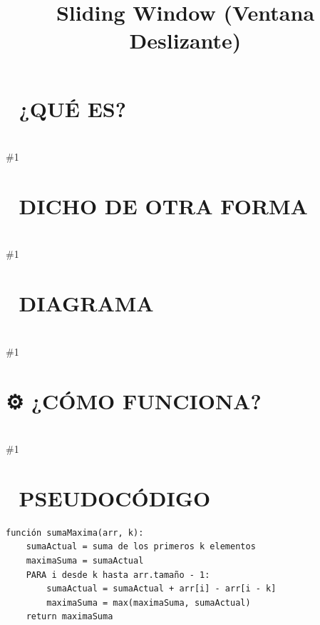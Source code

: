 \documentclass{article}
\newcommand{\quees}[1]{\section*{🤔 ¿QUÉ ES?}\hrulefill \\ \#1}
\newcommand{\dichodeotraforma}[1]{\section*{💬 DICHO DE OTRA FORMA}\hrulefill \\ \#1}
\newcommand{\diagrama}[1]{\section*{🎨 DIAGRAMA}\hrulefill \\ \#1}
\newcommand{\comofunciona}[1]{\section*{⚙️ ¿CÓMO FUNCIONA?}\hrulefill \\ \#1}
\begin{document}
\title{Sliding Window (Ventana Deslizante)}
\date{}
\maketitle
\quees{Una ventana de tren 🚂 donde ves paisajes mientras el tren avanza. 
La ventana tiene un tamaño fijo (por ejemplo, 3 metros de ancho).

Al avanzar, entra nuevo paisaje por un lado y sale el paisaje viejo
por el otro. No tienes que redibujar todo el paisaje cada vez, ¡solo
actualizas los bordes!

En programación, este patrón sirve para procesar sub-arreglos o 
sub-cadenas sin tener que recalcular todo desde cero en cada paso, 
lo cual ahorra muchísimo tiempo.}
\dichodeotraforma{El patrón Sliding Window convierte un problema de loops anidados O(n*k) 
en un problema de un solo loop O(n). 

Se usa cuando te piden algo sobre elementos CONTIGUOS de un array o 
string. Existen dos tipos:
1. Fixed Size: La ventana siempre mide K elementos.
2. Variable Size: La ventana crece o se encoge según una condición
   (usualmente usando dos punteros).}
\diagrama{\begin{verbatim}
Array: [ 1, 3, 2, 6, -1, 4 ]
Meta: Suma de cada ventana de tamaño 3.

Paso 1: [ 1, 3, 2 ] , 6, -1, 4  -> Suma = 6
Paso 2: 1, [ 3, 2, 6 ] , -1, 4  -> Suma = 11 (6 - 1 + 6)
Paso 3: 1, 3, [ 2, 6, -1 ] , 4  -> Suma = 7  (11 - 3 + (-1))

¡Solo restas el que sale y sumas el que entra! ⚡
\end{verbatim}}
\comofunciona{Fixed Size Window:
1. Calculas el resultado de la primera ventana (índices 0 a K-1).
2. Empiezas un loop desde el índice K hasta el final.
3. En cada paso:
   - Sumas el nuevo elemento (`arr[i]`).
   - Restas el elemento que sale (`arr[i - K]`).
   - Actualizas el resultado máximo/mínimo.

Variable Size Window:
1. Usas dos punteros: `start` y `end` (ambos en 0).
2. Mueves `end` para expandir la ventana y cumplir una condición.
3. Si la condición se rompe, mueves `start` para encoger la ventana.}
\section*{📝 PSEUDOCÓDIGO}
\hrulefill
\begin{verbatim}
función sumaMaxima(arr, k):
    sumaActual = suma de los primeros k elementos
    maximaSuma = sumaActual
    PARA i desde k hasta arr.tamaño - 1:
        sumaActual = sumaActual + arr[i] - arr[i - k]
        maximaSuma = max(maximaSuma, sumaActual)
    return maximaSuma
\end{verbatim}
\end{document}
